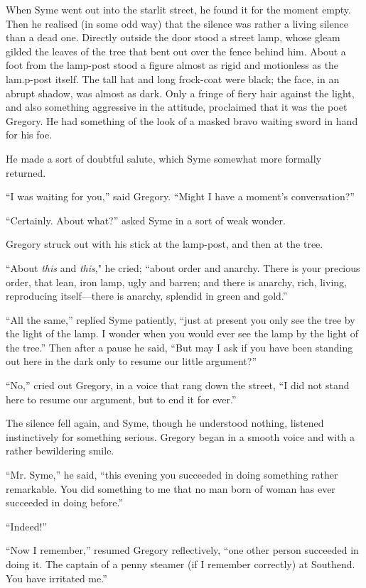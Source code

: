 \documentclass{book}
\begin{document}
When Syme went out into the starlit street, he found it for the moment empty. Then he realised (in some odd way) that the silence was rather a living silence than a dead one. Directly outside the door stood a street lamp, whose gleam gilded the leaves of the tree that bent out over the fence behind him. About a foot from the lamp-post stood a figure almost as rigid and motionless as the lam.p-post itself. The tall hat and long frock-coat were black; the face, in an abrupt shadow, was almost as dark. Only a fringe of fiery hair against the light, and also something aggressive in the attitude, proclaimed that it was the poet Gregory. He had something of the look of a masked bravo waiting sword in hand for his foe.

He made a sort of doubtful salute, which Syme somewhat more formally returned.

“I was waiting for you,” said Gregory. “Might I have a moment’s conversation?”

“Certainly. About what?” asked Syme in a sort of weak wonder.

Gregory struck out with his stick at the lamp-post, and then at the tree.

“About \emph{this} and \emph{this}," he cried; “about order and anarchy. There is your precious order, that lean, iron lamp, ugly and barren; and there is anarchy, rich, living, reproducing itself—there is anarchy, splendid in green and gold.”

“All the same,” replied Syme patiently, “just at present you only see the tree by the light of the lamp. I wonder when you would ever see the lamp by the light of the tree.” Then after a pause he said, “But may I ask if you have been standing out here in the dark only to resume our little argument?”

“No,” cried out Gregory, in a voice that rang down the street, “I did not stand here to resume our argument, but to end it for ever.”

The silence fell again, and Syme, though he understood nothing, listened instinctively for something serious. Gregory began in a smooth voice and with a rather bewildering smile.

“Mr. Syme,” he said, “this evening you succeeded in doing something rather remarkable. You did something to me that no man born of woman has ever succeeded in doing before.”

“Indeed!”

“Now I remember,” resumed Gregory reflectively, “one other person succeeded in doing it. The captain of a penny steamer (if I remember correctly) at Southend. You have irritated me.”
\end{document}
